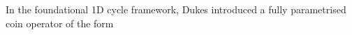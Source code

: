 In the foundational 1D cycle framework, Dukes \cite{Dukes2014}
introduced a fully parametrised coin operator of the form
